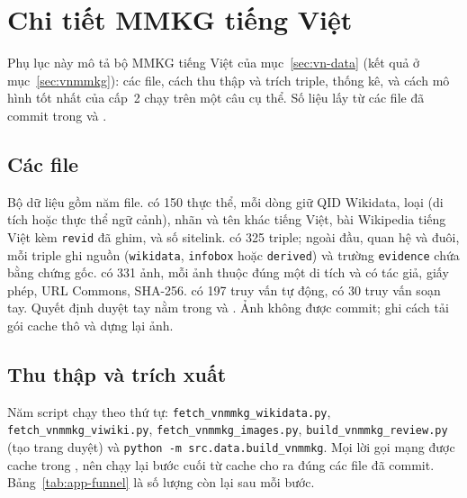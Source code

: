 \appendices
\section{Chi tiết MMKG tiếng Việt}\label{app:vnmmkg}

Phụ lục này mô tả bộ MMKG tiếng Việt của mục~\ref{sec:vn-data} (kết quả ở mục~\ref{sec:vnmmkg}): các file, cách thu thập và trích triple, thống kê,
và cách mô hình tốt nhất của cấp~2 chạy trên một câu cụ thể. Số liệu lấy từ các file đã commit trong
 và .

\subsection{Các file}\label{app:vn-files}

Bộ dữ liệu gồm năm file.  có 150 thực thể, mỗi dòng giữ QID Wikidata, loại (di tích hoặc
thực thể ngữ cảnh), nhãn và tên khác tiếng Việt, bài Wikipedia tiếng Việt kèm \texttt{revid} đã ghim, và số
sitelink.  có 325 triple; ngoài đầu, quan hệ và đuôi, mỗi triple ghi nguồn
(\texttt{wikidata}, \texttt{infobox} hoặc \texttt{derived}) và trường \texttt{evidence} chứa bằng chứng gốc.
 có 331 ảnh, mỗi ảnh thuộc đúng một di tích và có tác giả, giấy phép, URL Commons, SHA-256.
 có 197 truy vấn tự động,  có 30 truy vấn soạn tay. Quyết định
duyệt tay nằm trong  và . Ảnh không được commit;
 ghi cách tải gói cache thô và dựng lại ảnh.

\subsection{Thu thập và trích xuất}\label{app:vn-build}

Năm script chạy theo thứ tự: \texttt{fetch\_vnmmkg\_wikidata.py}, \texttt{fetch\_vnmmkg\_viwiki.py},
\texttt{fetch\_vnmmkg\_images.py}, \texttt{build\_vnmmkg\_review.py} (tạo trang duyệt) và
\texttt{python -m src.data.build\_vnmmkg}. Mọi lời gọi mạng được cache trong , nên chạy
lại bước cuối từ cache cho ra đúng các file đã commit. Bảng~\ref{tab:app-funnel} là số lượng còn lại sau mỗi bước.

